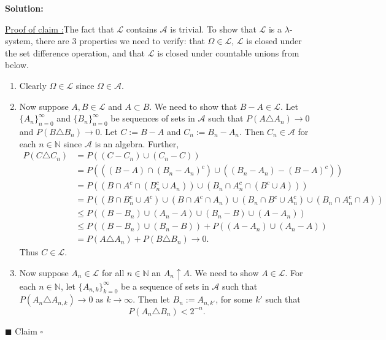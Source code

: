 \documentclass[12pt]{article}
\newcounter{ProofCounter}
\newcounter{ClaimCounter}[ProofCounter]
\newenvironment{Solution}{\stepcounter{ProofCounter}\textbf{Solution:}}{\hfill$\square$}
\newenvironment{claim}[1]{\vspace{1mm}\stepcounter{ClaimCounter}\par\noindent\underline{\bf Claim \theClaimCounter:}\space#1}{}
\newenvironment{claimproof}[1]{\par\noindent\underline{Proof of claim \theClaimCounter:}\space#1}{\hfill $\blacksquare$ Claim \theClaimCounter}
\begin{document}
\begin{Solution}
  \begin{claimproof}
    The fact that $\mathcal{L}$ contains $\mathcal{A}$ is trivial. To show that $\mathcal{L}$ is a $\lambda$-system, there are 3 properties we need to verify: that $\Omega \in \mathcal{L}$, $\mathcal{L}$ is closed under the set difference operation, and that $\mathcal{L}$ is closed under countable unions from below.
    \begin{enumerate}
      \item Clearly $\Omega \in \mathcal{L}$ since $\Omega \in \mathcal{A}$.
      \item Now suppose $A, B \in \mathcal{L}$ and $A \subset B$. We need to show that $B - A \in \mathcal{L}$. Let $\{ A_n \}_{n=0}^{\infty}$ and $\{ B_n \}_{n=0}^{\infty}$ be sequences of sets in $\mathcal{A}$ such that $P(A \triangle A_n) \rightarrow 0$ and $P(B \triangle B_n) \rightarrow 0$. Let $C := B - A$ and $C_n := B_n - A_n$. Then $C_n \in \mathcal{A}$ for each $n \in \mathbb{N}$ since $\mathcal{A}$ is an algebra. Further,
        \begin{align*}
          P(C\triangle C_n) & = P((C - C_n) \cup (C_n - C)) \\
          & = P(((B - A) \cap (B_n - A_n)^{c}) \cup ((B_n - A_n) - (B - A)^{c} )) \\
          & = P( (B \cap A^{c} \cap (B_n^{c} \cup A_n)) \cup (B_n \cap A_n^c \cap (B^c \cup A)) ) \\
          & = P( (B \cap B_n^c \cup A^c) \cup (B \cap A^c \cap A_n) \cup (B_n \cap B^c \cup A_n^c) \cup (B_n \cap A_n^c \cap A) ) \\
          & \leq P( (B - B_n) \cup (A_n - A) \cup (B_n - B) \cup (A - A_n) ) \\
          & \leq P( (B - B_n) \cup (B_n - B) ) + P( (A - A_n) \cup (A_n - A) ) \\
          & = P(A \triangle A_n) + P(B \triangle B_n) \rightarrow 0.
        \end{align*}
        Thus $C \in \mathcal{L}$.
      \item Now suppose $A_n \in \mathcal{L}$ for all $n \in \mathbb{N}$ an $A_n \uparrow A$. We need to show $A \in \mathcal{L}$. For each $n \in \mathbb{N}$, let $\{ A_{n,k} \}_{k=0}^{\infty}$ be a sequence of sets in $\mathcal{A}$ such that $P(A_n \triangle A_{n,k}) \rightarrow 0$ as $k \rightarrow \infty$. Then let $B_n := A_{n,k'}$, for some $k'$ such that 
        \begin{equation}
          P(A_n \triangle B_n) < 2^{-n}.
          \label{4.1}
        \end{equation}
        

\end{enumerate}
\end{claimproof}
\end{Solution}
\end{document}

